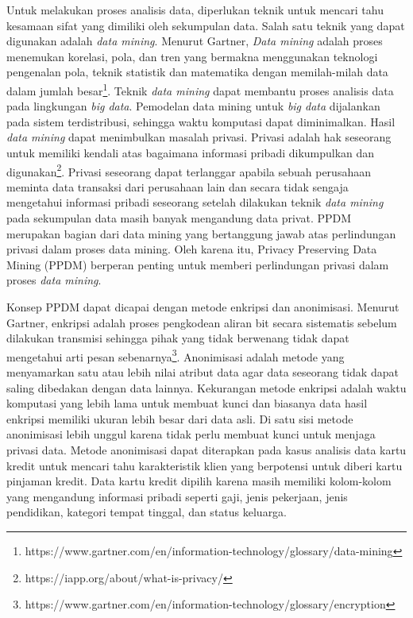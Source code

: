 Untuk melakukan proses analisis data, diperlukan teknik untuk mencari tahu kesamaan sifat yang dimiliki oleh sekumpulan data. Salah satu teknik yang dapat digunakan adalah {\it data mining}. Menurut Gartner, {\it Data mining} adalah proses menemukan korelasi, pola, dan tren yang bermakna menggunakan teknologi pengenalan pola, teknik statistik dan matematika dengan memilah-milah data dalam jumlah besar\footnote{https://www.gartner.com/en/information-technology/glossary/data-mining}. Teknik {\it data mining} dapat membantu proses analisis data pada lingkungan \textit{big data}. Pemodelan data mining untuk \textit{big data} dijalankan pada sistem terdistribusi, sehingga waktu komputasi dapat diminimalkan. Hasil \textit{data mining} dapat menimbulkan masalah privasi.  Privasi adalah hak seseorang untuk memiliki kendali atas bagaimana informasi pribadi dikumpulkan dan digunakan\footnote{https://iapp.org/about/what-is-privacy/}. Privasi seseorang dapat terlanggar apabila sebuah perusahaan meminta data transaksi dari perusahaan lain dan secara tidak sengaja mengetahui informasi pribadi seseorang setelah dilakukan teknik \textit{data mining} pada sekumpulan data masih banyak mengandung data privat.  PPDM merupakan bagian dari data mining yang bertanggung jawab atas perlindungan privasi dalam proses data mining. Oleh karena itu, Privacy Preserving Data Mining (PPDM) berperan penting untuk memberi perlindungan privasi dalam proses {\it data mining}.

Konsep PPDM dapat dicapai dengan metode enkripsi dan anonimisasi. Menurut Gartner, enkripsi adalah proses pengkodean aliran bit secara sistematis sebelum dilakukan transmisi sehingga pihak yang tidak berwenang tidak dapat mengetahui arti pesan sebenarnya\footnote{https://www.gartner.com/en/information-technology/glossary/encryption}. Anonimisasi adalah metode yang menyamarkan satu atau lebih nilai atribut data agar data seseorang tidak dapat saling dibedakan dengan data lainnya. Kekurangan metode enkripsi adalah waktu komputasi yang lebih lama untuk membuat kunci dan biasanya data hasil enkripsi memiliki ukuran lebih besar dari data asli. Di satu sisi metode anonimisasi lebih unggul karena tidak perlu membuat kunci untuk menjaga privasi data. Metode anonimisasi dapat diterapkan pada kasus analisis data kartu kredit untuk mencari tahu  karakteristik klien yang berpotensi untuk diberi kartu pinjaman kredit. Data kartu kredit dipilih karena masih memiliki kolom-kolom yang mengandung informasi pribadi seperti gaji, jenis pekerjaan, jenis pendidikan, kategori tempat tinggal, dan status keluarga.

